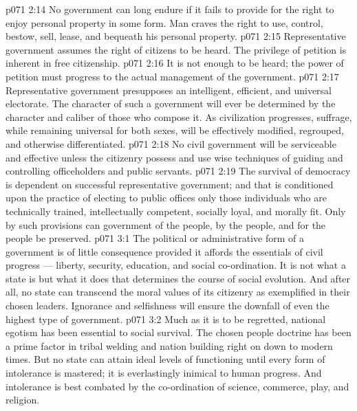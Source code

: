 \vs p071 2:14 \bibnobreakspace {} No government can long endure if it fails to provide for the right to enjoy personal property in some form. Man craves the right to use, control, bestow, sell, lease, and bequeath his personal property.
\vs p071 2:15 \bibnobreakspace {} Representative government assumes the right of citizens to be heard. The privilege of petition is inherent in free citizenship.
\vs p071 2:16 \bibnobreakspace {} It is not enough to be heard; the power of petition must progress to the actual management of the government.
\vs p071 2:17 \bibnobreakspace {} Representative government presupposes an intelligent, efficient, and universal electorate. The character of such a government will ever be determined by the character and caliber of those who compose it. As civilization progresses, suffrage, while remaining universal for both sexes, will be effectively modified, regrouped, and otherwise differentiated.
\vs p071 2:18 \bibnobreakspace {} No civil government will be serviceable and effective unless the citizenry possess and use wise techniques of guiding and controlling officeholders and public servants.
\vs p071 2:19 \bibnobreakspace {} The survival of democracy is dependent on successful representative government; and that is conditioned upon the practice of electing to public offices only those individuals who are technically trained, intellectually competent, socially loyal, and morally fit. Only by such provisions can government of the people, by the people, and for the people be preserved.
\vs p071 3:1 The political or administrative form of a government is of little consequence provided it affords the essentials of civil progress --- liberty, security, education, and social co\hyp{}ordination. It is not what a state is but what it does that determines the course of social evolution. And after all, no state can transcend the moral values of its citizenry as exemplified in their chosen leaders. Ignorance and selfishness will ensure the downfall of even the highest type of government.
\vs p071 3:2 Much as it is to be regretted, national egotism has been essential to social survival. The chosen people doctrine has been a prime factor in tribal welding and nation building right on down to modern times. But no state can attain ideal levels of functioning until every form of intolerance is mastered; it is everlastingly inimical to human progress. And intolerance is best combated by the co\hyp{}ordination of science, commerce, play, and religion.
